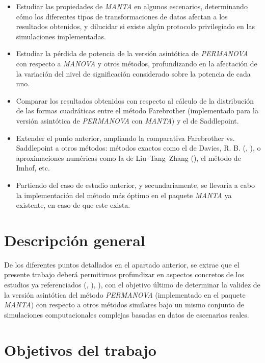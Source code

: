 \documentclass[IB,BIB]{TFUOC}%
\begin{document}
{%
\begin{itemize}
    \item Estudiar las propiedades de \textit{MANTA} en algunos escenarios, determinando cómo los diferentes tipos de transformaciones de datos afectan a los resultados obtenidos, y dilucidar si existe algún protocolo privilegiado en las simulaciones implementadas.
    \item Estudiar la pérdida de potencia de la versión asintótica de \textit{PERMANOVA} con respecto a \textit{MANOVA} y otros métodos, profundizando en la afectación de la variación del nivel de significación considerado sobre la potencia de cada uno.
    \item Comparar los resultados obtenidos con respecto al cálculo de la distribución de las formas cuadráticas entre el método Farebrother (implementado para la versión asintótica de \textit{PERMANOVA} con \textit{MANTA}) y el de Saddlepoint.
    \item Extender el punto anterior, ampliando la comparativa Farebrother vs. Saddlepoint a otros métodos: métodos exactos como el de Davies, R. B. (\cite{davies_numerical_1973}, \cite{davies_algorithm_1980}), o aproximaciones numéricas como la de Liu–Tang–Zhang (\cite{qi_genetic_2022}), el método de Imhof, etc.
    \item Partiendo del caso de estudio anterior, y secundariamente, se llevaría a cabo la implementación del método más óptimo en el paquete \textit{MANTA} ya existente, en caso de que este exista.
\end{itemize}}

\text{ }

\section{Descripción general}
\label{sec:PEC1 - Descripción general}

De los diferentes puntos detallados en el apartado anterior, se extrae que el presente trabajo deberá permitirnos profundizar en aspectos concretos de los estudios ya referenciados (\cite{garrido-martin_fast_2022}, \cite{garrido-martin_identification_2021}), \cite{monlong_identification_2014}), con el objetivo último de determinar la validez de la versión asintótica del método \textit{PERMANOVA} (implementado en el paquete \textit{MANTA}) con respecto a otros métodos similares bajo un mismo conjunto de simulaciones computacionales complejas basadas en datos de escenarios reales.


\newpage
\section{Objetivos del trabajo}
\label{sec:PEC1 - Objetivos del trabajo}
\end{document}
